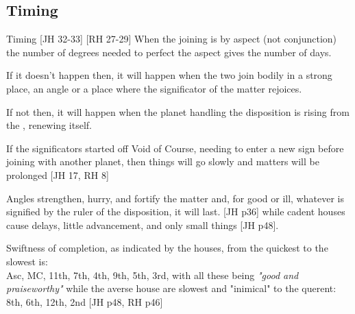 \subsection{Timing}
\begin{frame}[t]{Timing  [JH 32-33] [RH 27-29]}
When the joining is by aspect (not conjunction) the number of degrees needed to perfect the aspect gives the number of days.

If it doesn't happen then, it will happen when the two join bodily in a strong place, an angle or a place where the significator of the matter rejoices.

If not then, it will happen when the planet handling the disposition is rising from the \Sun, renewing itself.

If the significators started off Void of Course, needing to enter a new sign before joining with  another planet, then things will go slowly and matters will be prolonged [JH 17, RH 8]

Angles strengthen, hurry, and fortify the matter and, for good or ill, whatever is signified by the ruler of the disposition, it will last. [JH p36] while cadent houses cause delays, little advancement, and only small things [JH p48].

Swiftness of completion, as indicated by the houses, from the quickest to the slowest is: \\
Asc, MC, 11th, 7th, 4th, 9th, 5th, 3rd,  with all these being \textsl{"good and praiseworthy"} while the averse house are slowest and "inimical" to the querent: 8th, 6th, 12th, 2nd [JH p48, RH p46]

\end{frame}